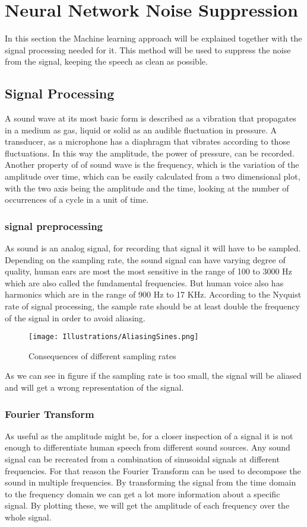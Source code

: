 \chapter{Neural Network Noise Suppression}\label{NeuralNetworkNoiseSuppression}
In this section the Machine learning approach will be explained together with the signal processing needed for it.
This method will be used to suppress the noise from the signal, keeping the speech as clean as possible.
\section{Signal Processing}
\label{SignalProcessing}
A sound wave at its most basic form is described as a vibration that propagates in a medium as gas, liquid or solid as an audible fluctuation in pressure. A transducer, as a microphone has a diaphragm that vibrates according to those fluctuations. In this way the amplitude, the power of pressure, can be recorded. Another property of of sound wave is the frequency, which is the variation of the amplitude over time, which can be easily calculated from a two dimensional plot, with the two axis being the amplitude and the time, looking at the number of occurrences of a cycle in a unit of time.
\subsection{signal preprocessing}
As sound is an analog signal, for recording that signal it will have to be sampled. Depending on the sampling rate, the sound signal can have varying degree of quality, human ears are most the most sensitive in the range of 100 to 3000 Hz which are also called the fundamental frequencies. But human voice also has harmonics which are in the range of 900 Hz to 17 KHz.
According to the Nyquist rate of signal processing, the sample rate should be at least double the frequency of the signal in order to avoid aliasing. 
\newpage
\begin{figure}[htp]
	\centering
	\texttt{[image: Illustrations/AliasingSines.png]}
	\caption{Consequences of different sampling rates}
	\label{fig:AliasingSines}
\end{figure}

As we can see in figure  if the sampling rate is too small, the signal will be aliased and will get a wrong representation of the signal.

\subsection{Fourier Transform}
As useful as the amplitude might be, for a closer inspection of a signal it is not enough to differentiate human speech from different sound sources. Any sound signal can be recreated from a combination of sinusoidal signals at different frequencies.  For that reason the Fourier Transform can be used to decompose the sound in multiple frequencies. By transforming the signal from the time domain to the frequency domain we can get a lot more information about a specific signal. By plotting these, we will get the amplitude of each frequency over the whole signal.


